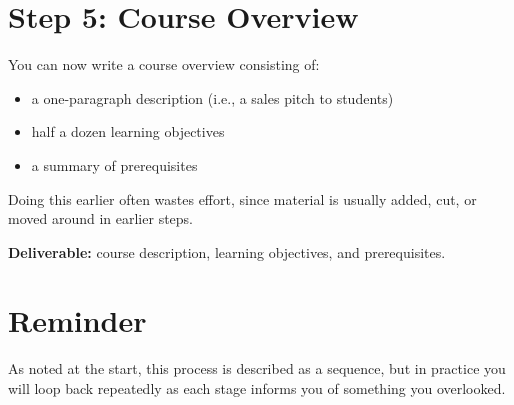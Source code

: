 \section{Step 5: Course Overview}\label{step-5-course-overview}

You can now write a course overview consisting of:

\begin{itemize}
\item
  a one-paragraph description (i.e., a sales pitch to students)
\item
  half a dozen learning objectives
\item
  a summary of prerequisites
\end{itemize}

Doing this earlier often wastes effort, since material is usually added,
cut, or moved around in earlier steps.

\textbf{Deliverable:} course description, learning objectives, and
prerequisites.

\section{Reminder}\label{reminder}

As noted at the start, this process is described as a sequence, but in
practice you will loop back repeatedly as each stage informs you of
something you overlooked.
